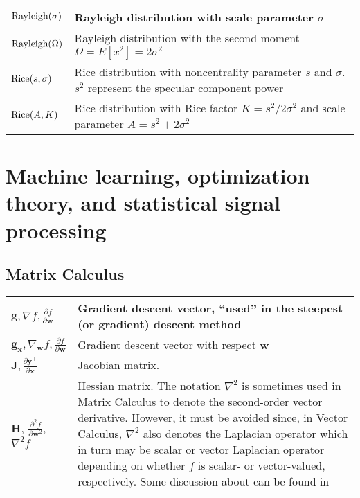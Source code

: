 \documentclass{article}
\begin{document}
\begin{xltabular}{\textwidth}{XX}
	\(\textnormal{Rayleigh}(\sigma)\)                           & Rayleigh distribution with scale parameter \(\sigma\)                                                                                      \\ \hline
	\(\textnormal{Rayleigh}(\Omega)\)                           & Rayleigh distribution with the second moment \(\Omega = E\left[ x^2 \right] = 2\sigma^2\)                                                  \\ \hline
	\(\textnormal{Rice}(s, \sigma)\)                            & Rice distribution with noncentrality parameter \(s\) and \(\sigma\). \(s^2\) represent the specular component power                        \\ \hline
	\(\textnormal{Rice}(A, K)\)                                 & Rice distribution with Rice factor \(K=s^2/2\sigma^2\) and scale parameter \(A = s^2 + 2\sigma^2\)
\end{xltabular}

\section{Machine learning, optimization theory, and \newline statistical signal processing}
\subsection{Matrix Calculus}
\begin{xltabular}{\textwidth}{XX}
	\(\mathbf{g}, \nabla f, \frac{\partial f}{\partial \mathbf{w}}\) & Gradient descent vector, ``used'' in the steepest (or gradient) descent method        \\ \hline
	\(\mathbf{g}_{\mathbf{x}}, \nabla_{\mathbf{w}}f, \frac{\partial f}{\partial \mathbf{w}}\)                         & Gradient descent vector with respect \(\mathbf{w}\) \cite{bishopPatternRecognitionMachine2006} \\ \hline
	\(\mathbf{J}, \frac{\partial \mathbf{y}^{\top}}{\partial \mathbf{x}}\)                                                       & Jacobian matrix.                                                                       \\ \hline
	\(\mathbf{H}\), \(\frac{\partial^2 f}{\partial \mathbf{w}^2}\), \(\nabla^2 f\) \cite{haykinNeuralNetworksLearning2009}               & Hessian matrix. The notation \(\nabla^2\) is sometimes used in Matrix Calculus to denote the second-order vector derivative. However, it must be avoided since, in Vector Calculus, \(\nabla^2\) also denotes the Laplacian operator which in turn may be scalar or vector Laplacian operator depending on whether \(f\) is scalar- or vector-valued, respectively. Some discussion about can be found in \cite{4693212, 1353761, 4560326} \\ \hline
\end{xltabular}
\end{document}
